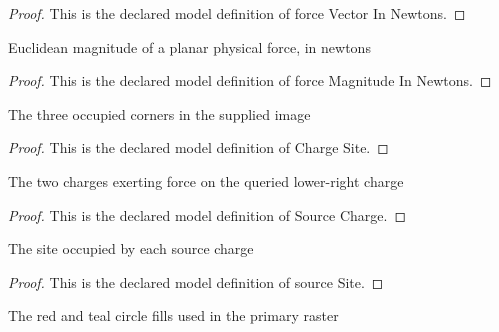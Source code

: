 \begin{proof}
  This is the declared model definition of force Vector In Newtons.
\end{proof}
\begin{definition}
  \label{def:physics:phyx-mini-0896:phyxminiproblems-problemphyxmini0896-forcemagnitudeinnewtons}
  Euclidean magnitude of a planar physical force, in newtons
\end{definition}
\begin{proof}
  This is the declared model definition of force Magnitude In Newtons.
\end{proof}
\begin{definition}
  \label{def:physics:phyx-mini-0896:phyxminiproblems-problemphyxmini0896-chargesite}
  The three occupied corners in the supplied image
\end{definition}
\begin{proof}
  This is the declared model definition of Charge Site.
\end{proof}
\begin{definition}
  \label{def:physics:phyx-mini-0896:phyxminiproblems-problemphyxmini0896-sourcecharge}
  The two charges exerting force on the queried lower-right charge
\end{definition}
\begin{proof}
  This is the declared model definition of Source Charge.
\end{proof}
\begin{definition}
  \label{def:physics:phyx-mini-0896:phyxminiproblems-problemphyxmini0896-sourcesite}
  The site occupied by each source charge
\end{definition}
\begin{proof}
  This is the declared model definition of source Site.
\end{proof}
\begin{definition}
  \label{def:physics:phyx-mini-0896:phyxminiproblems-problemphyxmini0896-figurechargecolor}
  The red and teal circle fills used in the primary raster
\end{definition}
